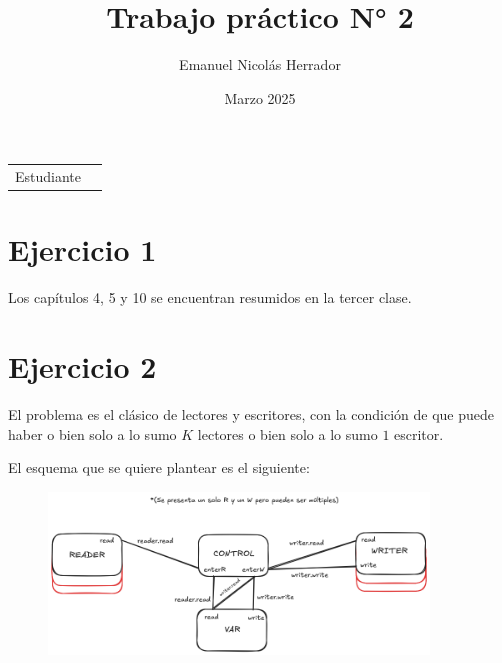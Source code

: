 \documentclass{article}
\title{Trabajo práctico N° 2}
\author{Emanuel Nicolás Herrador}
\date{Marzo 2025}
\begin{document}
\maketitle

\noindent\begin{tabular}{@{}ll}
	Estudiante & \theauthor \\
\end{tabular}

\section*{Ejercicio 1}
Los capítulos 4, 5 y 10 se encuentran resumidos en la tercer clase.

\section*{Ejercicio 2}
El problema es el clásico de lectores y escritores, con la condición de que puede haber o bien solo a lo sumo $K$ lectores o bien solo a lo sumo $1$ escritor.

El esquema que se quiere plantear es el siguiente:
\begin{figure}[ht]
	\includegraphics[width=0.9\textwidth]{02-02.png}
	\centering
\end{figure}
\end{document}
